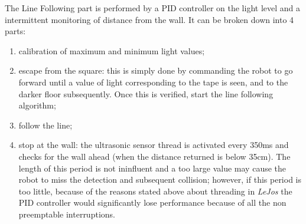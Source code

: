 \documentclass[a4paper,11pt,oneside]{book}
\begin{document}
		The Line Following part is performed by a PID controller on the light level and a intermittent monitoring of distance from the wall. It can be broken down into 4 parts:
		\begin{enumerate}
			\item calibration of maximum and minimum light values;
			\item escape from the square: this is simply done by commanding the robot to go forward until a value of light corresponding to the tape is seen, and to the darker floor subsequently. Once this is verified, start the line following algorithm;
			\item follow the line;
			\item stop at the wall: the ultrasonic sensor thread is activated every 350ms and checks for the wall ahead (when the distance returned is below 35cm). The length of this period is not ininfluent and a too large value may cause the robot to miss the detection and subsequent collision; however, if this period is too little, because of the reasons stated above about threading in \textit{LeJos} the PID controller would significantly lose performance because of all the non preemptable interruptions.
		\end{enumerate} 
	
\end{document}
